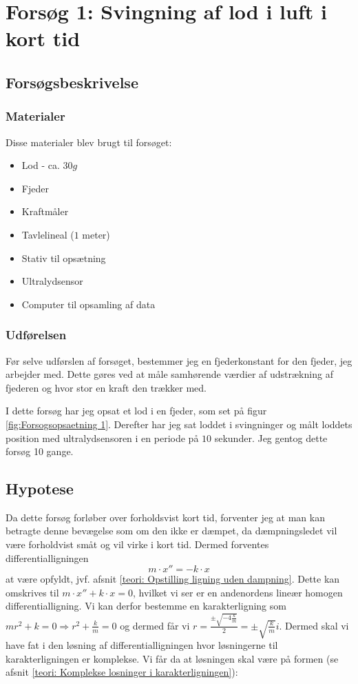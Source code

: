 \section{Forsøg 1: Svingning af lod i luft i kort tid}\label{exp1: Forsog 1 - hele afsnittet}

\subsection{Forsøgsbeskrivelse}\label{exp1: Beskrivelse af experiment}
\subsubsection{Materialer}


Disse materialer blev brugt til forsøget:
\begin{itemize}
	\setlength\itemsep{-1em}
	\item Lod - ca. $30g$
	\item Fjeder
	\item Kraftmåler
	\item Tavlelineal ($1$ meter)
	\item Stativ til opsætning
	\item Ultralydsensor
	\item Computer til opsamling af data
\end{itemize}

\subsubsection{Udførelsen}\label{exp1: Udforelse}



Før selve udførslen af forsøget, bestemmer jeg en fjederkonstant for den fjeder, jeg arbejder med. 
Dette gøres ved at måle samhørende værdier af udstrækning af fjederen og hvor stor en kraft den trækker med. 

I dette forsøg har jeg opsat et lod i en fjeder, som set på figur \ref{fig:Forsogsopsaetning 1}.
Derefter har jeg sat loddet i svingninger og målt loddets position med ultralydsensoren i en periode på $10$ sekunder. 
Jeg gentog dette forsøg 10 gange. 


\subsection{Hypotese}\label{exp1: Hypotese}
Da dette forsøg forløber over forholdsvist kort tid, forventer jeg at man kan betragte denne bevægelse som om den ikke er dæmpet, da dæmpningsledet vil være forholdvist småt og vil virke i kort tid. 
Dermed forventes differentialligningen 
$$m\cdot x'' = -k \cdot x$$
at være opfyldt, jvf. afsnit \ref{teori: Opstilling ligning uden dampning}.
Dette kan omskrives til $m\cdot x'' + k\cdot x=0$, hvilket vi ser er en andenordens lineær homogen differentialligning. 
Vi kan derfor bestemme en karakterligning som $mr^2 + k = 0 \Rightarrow r^2 + \frac{k}{m} = 0$ og dermed får vi $r = \frac{\pm \sqrt{-4\frac{k}{m}}}{2}=\pm\sqrt{\frac{k}{m}}i$.
Dermed skal vi have fat i den løsning af differentialligningen hvor løsningerne til karakterligningen er komplekse. 
Vi får da at løsningen skal være på formen (se afsnit \ref{teori: Komplekse losninger i karakterligningen}):

